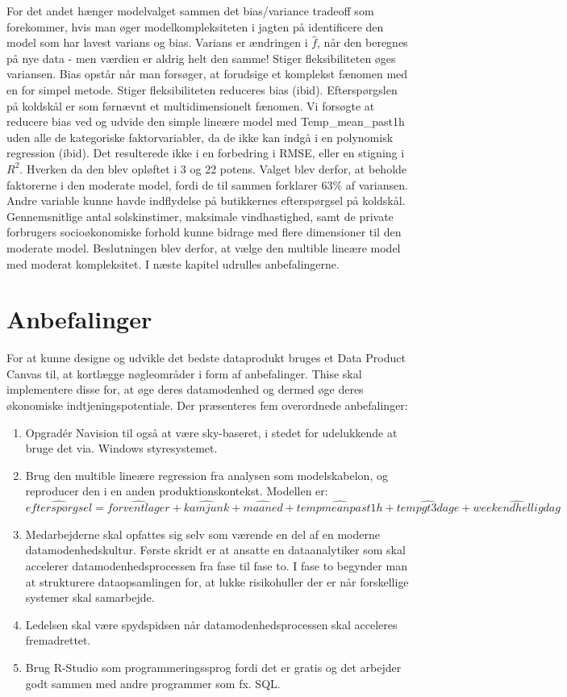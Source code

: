 \documentclass[
  12pt,
  a4paper,
  DIV=11,
  numbers=noendperiod]{scrartcl}
\begin{document}
For det andet hænger modelvalget sammen det bias/variance tradeoff som
forekommer, hvis man øger modelkompleksiteten i jagten på identificere
den model som har lavest varians og bias. Varians er ændringen i
\(\hat{f}\), når den beregnes på nye data - men værdien er aldrig helt
den samme! Stiger fleksibiliteten øges variansen. Bias opstår når man
forsøger, at forudsige et komplekst fænomen med en for simpel metode.
Stiger fleksibiliteten reduceres bias (ibid). Efterspørgslen på koldskål
er som førnævnt et multidimensionelt fænomen. Vi forsøgte at reducere
bias ved og udvide den simple lineære model med Temp\_mean\_past1h uden
alle de kategoriske faktorvariabler, da de ikke kan indgå i en
polynomisk regression (ibid). Det resulterede ikke i en forbedring i
RMSE, eller en stigning i \(R^2\). Hverken da den blev opløftet i 3 og
22 potens. Valget blev derfor, at beholde faktorerne i den moderate
model, fordi de til sammen forklarer \(63\%\) af variansen. Andre
variable kunne havde indflydelse på butikkernes efterspørgsel på
koldskål. Gennemsnitlige antal solskinstimer, maksimale vindhastighed,
samt de private forbrugers socioøkonomiske forhold kunne bidrage med
flere dimensioner til den moderate model. Beslutningen blev derfor, at
vælge den multible lineære model med moderat kompleksitet. I næste
kapitel udrulles anbefalingerne.

\hypertarget{anbefalinger}{%
\section{Anbefalinger}\label{anbefalinger}}

For at kunne designe og udvikle det bedste dataprodukt bruges et Data
Product Canvas til, at kortlægge nøgleområder i form af anbefalinger.
Thise skal implementere disse for, at øge deres datamodenhed og dermed
øge deres økonomiske indtjeningspotentiale. Der præsenteres fem
overordnede anbefalinger:

\begin{enumerate}
\def\labelenumi{\arabic{enumi}.}
\item
  Opgradér Navision til også at være sky-baseret, i stedet for
  udelukkende at bruge det via. Windows styresystemet.
\item
  Brug den multible lineære regression fra analysen som modelskabelon,
  og reproducer den i en anden produktionskontekst. Modellen er:
  \(\hat{efterspørgsel} = \hat{forventlager} + \hat{kamjunk} + \hat{maaned} + \hat{tempmeanpast1h} + \hat{tempgt3dage} + \hat{weekendhelligdag}\)
\item
  Medarbejderne skal opfattes sig selv som værende en del af en moderne
  datamodenhedskultur. Første skridt er at ansatte en dataanalytiker som
  skal accelerer datamodenhedsprocessen fra fase til fase to. I fase to
  begynder man at strukturere dataopsamlingen for, at lukke risikohuller
  der er når forskellige systemer skal samarbejde.
\item
  Ledelsen skal være spydspidsen når datamodenhedsprocessen skal
  acceleres fremadrettet.
\item
  Brug R-Studio som programmeringssprog fordi det er gratis og det
  arbejder godt sammen med andre programmer som fx. SQL.
\end{enumerate}
\end{document}
